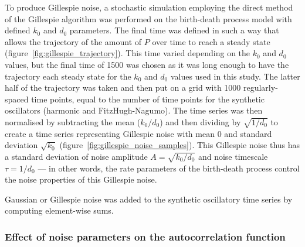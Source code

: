 To produce Gillespie noise, a stochastic simulation employing the direct method of the Gillespie algorithm was performed on the birth-death process model with defined $k_{0}$ and $d_{0}$ parameters.
The final time was defined in such a way that allows the trajectory of the amount of $P$ over time to reach a steady state (figure~\ref{fig:gillespie_trajectory}).
This time varied depending on the $k_{0}$ and $d_{0}$ values, but the final time of \num{1500} was chosen as it was long enough to have the trajectory each steady state for the $k_{0}$ and $d_{0}$ values used in this study.
The latter half of the trajectory was taken and then put on a grid with \num{1000} regularly-spaced time points, equal to the number of time points for the synthetic oscillators (harmonic and FitzHugh-Nagumo).
The time series was then normalised by subtracting the mean ($k_{0}/d_{0}$) and then dividing by $\sqrt{1/d_{0}}$ to create a time series representing Gillespie noise with mean 0 and standard deviation $\sqrt{k_{0}}$ (figure~\ref{fig:gillespie_noise_samples}).
This Gillespie noise thus has a standard deviation of noise amplitude $A = \sqrt{k_{0}/d_{0}}$ and noise timescale $\tau = 1/d_{0}$ --- in other words, the rate parameters of the birth-death process control the noise properties of this Gillespie noise.

Gaussian or Gillespie noise was added to the synthetic oscillatory time series by computing element-wise sums.

\subsubsection{Effect of noise parameters on the autocorrelation function}
\label{subsubsec:analysis-characterisation-acf-sinusoid}

